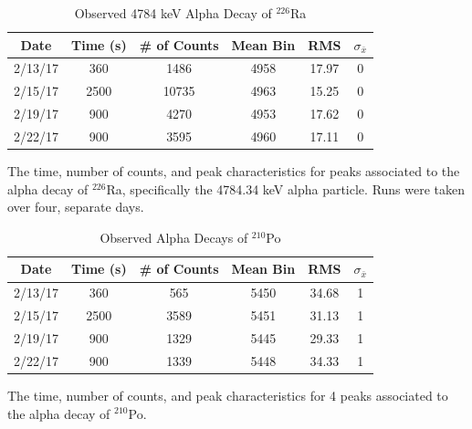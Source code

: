 \documentclass[10pt]{IEEEtran}
\begin{document}
    \begin{table}[!h]
        \begin{center}
        \caption{Observed 4784 keV Alpha Decay of $^{226}$Ra}
        \label{tab:ra226}
        \begin{tabular}{|c|c|c|c|c|c|}
            \hline
            Date & Time (s) & \# of Counts & Mean Bin & RMS & $\sigma_{\bar{x}}$ \\
            \hline
            2/13/17 & 360 & 1486 & 4958 & 17.97 & 0 \\
            \hline
            2/15/17 & 2500 & 10735 & 4963 & 15.25 & 0 \\
            \hline
            2/19/17 & 900 & 4270 & 4953 & 17.62 & 0 \\
            \hline
            2/22/17 & 900 & 3595 & 4960 & 17.11 & 0 \\
            \hline
        \end{tabular}
        \end{center}
        The time, number of counts, and peak characteristics for peaks associated to the alpha decay of $^{226}$Ra, specifically the 4784.34 keV alpha particle. Runs were taken over four, separate days.
    \end{table}    
    
    \begin{table}[!h]
        \begin{center}
        \caption{Observed Alpha Decays of $^{210}$Po}
        \label{tab:po210}
        \begin{tabular}{|c|c|c|c|c|c|}
            \hline
            Date & Time (s) & \# of Counts & Mean Bin & RMS & $\sigma_{\bar{x}}$ \\
            \hline
            2/13/17 & 360 & 565 & 5450 & 34.68 & 1 \\
            \hline
            2/15/17 & 2500 & 3589 & 5451 & 31.13 & 1 \\
            \hline
            2/19/17 & 900 & 1329 & 5445 & 29.33 & 1 \\
            \hline
            2/22/17 & 900 & 1339 & 5448 & 34.33 & 1 \\
            \hline
        \end{tabular}
        \end{center}
        The time, number of counts, and peak characteristics for 4 peaks associated to the alpha decay of $^{210}$Po.
    \end{table}
    
\end{document}
